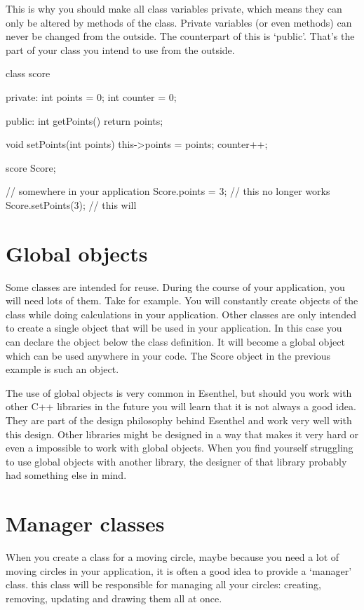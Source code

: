 This is why you should make all class variables private, which means they can only be altered by methods of the class. Private variables (or even methods) can never be changed from the outside. The counterpart of this is `public'. That's the part of your class you intend to use from the outside.

\begin{code}
class score {
private:
  int points  = 0;
  int counter = 0;
  
public:  
  int getPoints() { 
    return points;
  }
  
  void setPoints(int points) {
    this->points = points;
    counter++;
  } 
}
score Score;

// somewhere in your application
Score.points = 3; // this no longer works
Score.setPoints(3); // this will
\end{code}

\section{Global objects}
Some classes are intended for reuse. During the course of your application, you will need lots of them. Take  for example. You will constantly create objects of the class  while doing calculations in your application. Other classes are only intended to create a single object that will be used in your application. In this case you can declare the object below the class definition. It will become a global object which can be used anywhere in your code. The Score object in the previous example is such an object.

\begin{note}
The use of global objects is very common in Esenthel, but should you work with other C++ libraries in the future you will learn that it is not always a good idea. They are part of the design philosophy behind Esenthel and work very well with this design. Other libraries might be designed in a way that makes it very hard or even a impossible to work with global objects. When you find yourself struggling to use global objects with another library, the designer of that library probably had something else in mind.
\end{note}

\section{Manager classes}
\label{section:managerClass}
When you create a class for a moving circle, maybe because you need a lot of moving circles in your application, it is often a good idea to provide a `manager' class. this class will be responsible for managing all your circles: creating, removing, updating and drawing them all at once.

